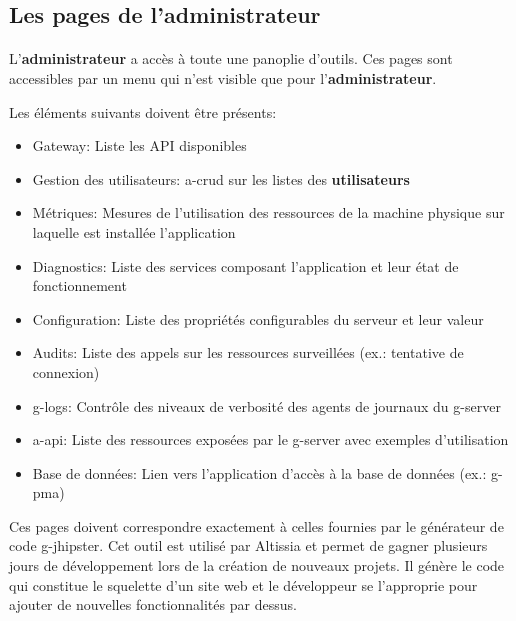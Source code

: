 \subsection{Les pages de l'administrateur}
\label{subsec:admin-pages}

\paragraph{}
L'\textbf{administrateur} a accès à toute une panoplie d'outils.
Ces pages sont accessibles par un menu qui n'est visible que pour l'\textbf{administrateur}.

Les éléments suivants doivent être présents:
\begin{itemize}
    \item Gateway: Liste les API disponibles
    \item Gestion des utilisateurs: \acrshort{a-crud} sur les listes des \textbf{utilisateurs}
    \item Métriques: Mesures de l'utilisation des ressources de la machine physique sur laquelle est installée l'application
    \item Diagnostics: Liste des services composant l'application et leur état de fonctionnement
    \item Configuration: Liste des propriétés configurables du serveur et leur valeur
    \item Audits: Liste des appels sur les ressources surveillées (ex.: tentative de connexion)
    \item \Glspl{g-log}: Contrôle des niveaux de verbosité des agents de journaux du \gls{g-server}
    \item \gls{a-api}: Liste des ressources exposées par le \gls{g-server} avec exemples d'utilisation
    \item Base de données: Lien vers l'application d'accès à la base de données (ex.: \gls{g-pma})
\end{itemize}

Ces pages doivent correspondre exactement à celles fournies par le générateur de code \Gls{g-jhipster}.
Cet outil est utilisé par Altissia et permet de gagner plusieurs jours de développement lors de la création de nouveaux projets.
Il génère le code qui constitue le squelette d'un site web et le développeur se l'approprie pour ajouter de nouvelles fonctionnalités par dessus.
